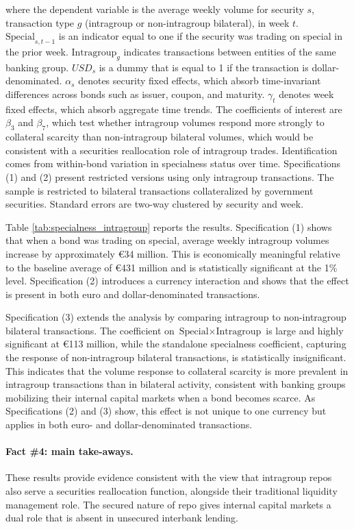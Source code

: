 \documentclass[english, 12pt, oneside]{article}
\begin{document}
where the dependent variable is the average weekly volume for security $s$, transaction type $g$ (intragroup or non-intragroup bilateral), in week $t$. $\text{Special}_{s,t-1}$ is an indicator equal to one if the security was trading on special in the prior week. $\text{Intragroup}_{g}$ indicates transactions between entities of the same banking group. $USD_s$ is a dummy that is equal to 1 if the transaction is dollar-denominated. $\alpha_s$ denotes security fixed effects, which absorb time-invariant differences across bonds such as issuer, coupon, and maturity. $\gamma_t$ denotes week fixed effects, which absorb aggregate time trends. The coefficients of interest are $\beta_3$ and $\beta_7$, which test whether intragroup volumes respond more strongly to collateral scarcity than non-intragroup bilateral volumes, which would be consistent with a securities reallocation role of intragroup trades. Identification comes from within-bond variation in specialness status over time. Specifications (1) and (2) present restricted versions using only intragroup transactions. The sample is restricted to bilateral transactions collateralized by government securities. Standard errors are two-way clustered by security and week.

Table \ref{tab:specialness_intragroup} reports the results. Specification (1) shows that when a bond was trading on special, average weekly intragroup volumes increase by approximately \euro 34 million. This is economically meaningful relative to the baseline average of \euro 431 million and is statistically significant at the 1\% level. Specification (2) introduces a currency interaction and shows that the effect is present in both euro and dollar-denominated transactions.

Specification (3) extends the analysis by comparing intragroup to non-intragroup bilateral transactions. The coefficient on $\text{Special} \times \text{Intragroup}$ is large and highly significant at \euro 113 million, while the standalone specialness coefficient, capturing the response of non-intragroup bilateral transactions, is statistically insignificant. This indicates that the volume response to collateral scarcity is more prevalent in intragroup transactions than in bilateral activity, consistent with banking groups mobilizing their internal capital markets when a bond becomes scarce. As Specifications (2) and (3) show, this effect is not unique to one currency but applies in both euro- and dollar-denominated transactions.

\paragraph{Fact \#4: main take-aways.}
These results provide evidence consistent with the view that intragroup repos also serve a securities reallocation function, alongside their traditional liquidity management role. The secured nature of repo gives internal capital markets a dual role that is absent in unsecured interbank lending.
\end{document}
